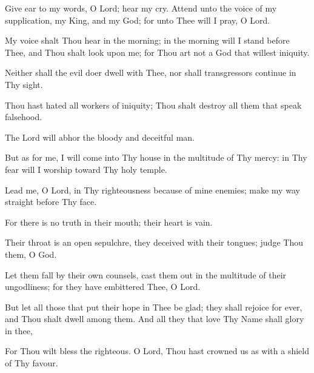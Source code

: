 Give ear to my words, O Lord; hear my cry. Attend unto the voice of my supplication, my King, and my God; for unto Thee will I pray, O Lord.

My voice shalt Thou hear in the morning; in the morning will I stand before Thee, and Thou shalt look upon me; for Thou art not a God that willest iniquity.

Neither shall the evil doer dwell with Thee, nor shall transgressors continue in Thy sight.

Thou hast hated all workers of iniquity; Thou shalt destroy all them that speak falsehood.

The Lord will abhor the bloody and deceitful man.

But as for me, I will come into Thy house in the multitude of Thy mercy: in Thy fear will I worship toward Thy holy temple.

Lead me, O Lord, in Thy righteousness because of mine enemies; make my way straight before Thy face.

For there is no truth in their mouth; their heart is vain.

Their throat is an open sepulchre, they deceived with their tongues; judge Thou them, O God.

Let them fall by their own counsels, cast them out in the multitude of their ungodliness; for they have embittered Thee, O Lord.

But let all those that put their hope in Thee be glad; they shall rejoice for ever, and Thou shalt dwell among them. And all they that love Thy Name shall glory in thee,

For Thou wilt bless the righteous. O Lord, Thou hast crowned us as with a shield of Thy favour.
